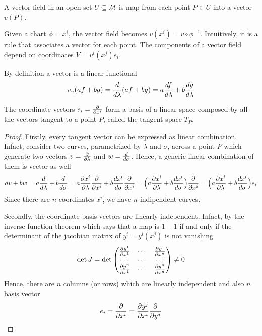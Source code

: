     \begin{definition}
        A vector field in an open set $U \subseteq \mathcal M$ is map from each point $P \in U$ into a vector $v(P)$.
    \end{definition} 
    \noindent Given a chart $\phi = x^i$, the vector field becomes $v (x^i) = v \circ \phi^{-1}$. Intuitively, it is a rule that associates a vector for each point. The components of a vector field depend on coordinates $V = v^i(x^j) e_i$.

    By definition a vector is a linear functional
    \begin{equation*}
        v_\gamma (af + bg) = \frac{d}{d\lambda} (af+bg) = a \frac{df}{d\lambda} + b \frac{dg}{d\lambda}
    \end{equation*}

    The coordinate vectors $e_i = \frac{\partial}{\partial x^i}$ form a basis of a linear space composed by all the vectors tangent to a point $P$, called the tangent space $T_P$.

    \begin{proof}
    Firstly, every tangent vector can be expressed as linear combination. Infact, consider two curves, parametrized by $\lambda$ and $\sigma$, across a point $P$ which generate two vectors $v = \frac{\partial}{\partial\lambda}$ and $w = \frac{d}{d\sigma}$. Hence, a generic linear combination of them is vector as well
    \begin{equation*}
        a v + b w = a \frac{d}{d\lambda} + b \frac{d}{d\sigma} = a \frac{\partial x^i}{\partial\lambda} \frac{\partial}{\partial x^i} + b \frac{dx^i}{d\sigma} \frac{\partial}{\partial x^i} = \Big ( a \frac{\partial x^i}{\partial\lambda} + b \frac{dx^i}{d\sigma} \Big ) \frac{\partial}{\partial x^i} = \Big ( a \frac{\partial x^i}{\partial\lambda} + b \frac{dx^i}{d\sigma} \Big ) e_i
    \end{equation*}
    Since there are $n$ coordinates $x^i$, we have $n$ indipendent curves.

    Secondly, the coordinate basis vectors are linearly independent. 
    Infact, by the inverse function theorem which says that a map is $1-1$ if and only if the determinant of the jacobian matrix of $y^i = y^i(x^j)$ is not vanishing
    \begin{equation*}
        \det J = \det 
        \begin{pmatrix}
            \frac{\partial y^1}{\partial x^1} & \cdots & \frac{\partial y^1}{\partial x^n} \\
            \cdots & \cdots & \cdots \\
            \frac{\partial y^n}{\partial x^1} & \cdots & \frac{\partial y^n}{\partial x^n} \\
        \end{pmatrix} \neq 0
    \end{equation*}
    Hence, there are $n$ columns (or rows) which are linearly independent and also $n$ basis vector
    \begin{equation*}
        e_i = \frac{\partial}{\partial x^i} = \frac{\partial y^j}{\partial x^i} \frac{\partial}{\partial y^j}
    \end{equation*}
    \end{proof}

